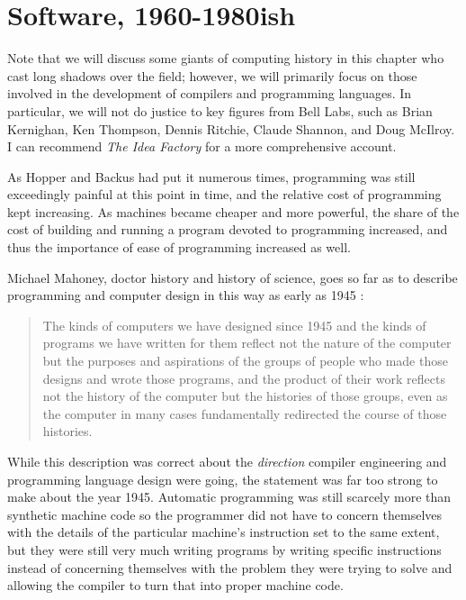
\chapter{Software, 1960-1980ish}

Note that we will discuss some giants of computing history in this chapter who cast long
shadows over the field; however, we will primarily focus on those involved in the
development of compilers and programming languages.
In particular, we will not do justice to key figures from Bell Labs, such as
Brian Kernighan, Ken Thompson, Dennis Ritchie, Claude Shannon, and Doug McIlroy.
I can recommend \textit{The Idea Factory} for a more comprehensive account.

As Hopper and Backus had put it numerous times, programming was still exceedingly
painful at this point in time, and the relative cost of programming kept increasing.
As machines became cheaper and more powerful, the share of the cost of building and
running a program devoted to programming increased, and thus the importance of
ease of programming increased as well.

Michael Mahoney, doctor history and history of science, goes so far as to describe programming
and computer design in this way as early as 1945
\cite[The Structures of Computation]{the-first-computers-2002}:
\begin{quotation}
    The kinds of computers we have designed since 1945 and the kinds of programs we have written for 
them reflect not the nature of the computer but the purposes and aspirations of the groups of people 
who made those designs and wrote those programs, and the product of their work reflects not the 
history of the computer but the histories of those groups, even as the computer in many 
cases fundamentally redirected the course of those histories.
\end{quotation}

While this description was correct about the \textit{direction} compiler engineering
and programming language design were going, the statement was far too strong to make
about the year 1945.
Automatic programming was still scarcely more than synthetic machine code so the programmer
did not have to concern themselves with the details of the particular machine's instruction set
to the same extent, but they were still very much writing programs by writing specific instructions
instead of concerning themselves with the problem they were trying to solve and allowing the
compiler to turn that into proper machine code.

